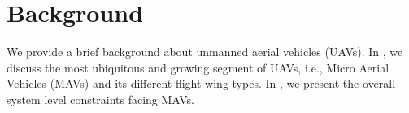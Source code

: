 \section{Background}
\label{sec:background}

We provide a brief background about unmanned aerial vehicles (UAVs). 
In , we discuss the most ubiquitous and growing segment of UAVs, i.e., Micro Aerial Vehicles (MAVs) and its different flight-wing types. In  , we present the overall system level constraints facing MAVs.

